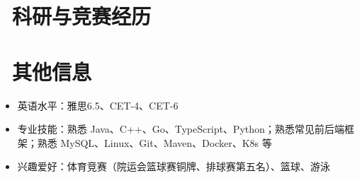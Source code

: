 \documentclass{../../styles/resume}
\begin{document}
\section{\faTrophy\ 科研与竞赛经历}

\section{\faInfo\ 其他信息}
\begin{itemize}
  \item 英语水平：雅思6.5、CET-4、CET-6
  \item 专业技能：熟悉 Java、C++、Go、TypeScript、Python；熟悉常见前后端框架；熟悉 MySQL、Linux、Git、Maven、Docker、K8s 等
  \item 兴趣爱好：体育竞赛（院运会篮球赛铜牌、排球赛第五名）、篮球、游泳
\end{itemize}
\end{document}
